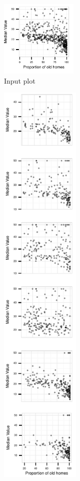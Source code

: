 \begin{figure}
 \centering 
    \begin{subfigure}[t]{1.45in}
        \includegraphics[width=1.45in]{images/AGE-MEDV.pdf}
        \caption{Input plot}
        \label{fig:method_original}
    \end{subfigure}
    \begin{subfigure}[t]{1.5in}
  	\includegraphics[width=1.5in]{images/TAX.pdf}

\end{subfigure}
\end{figure}
